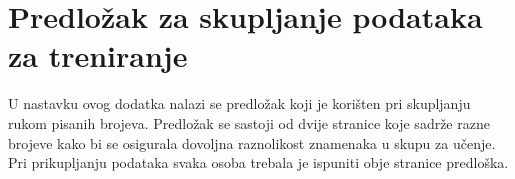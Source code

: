 \chapter{Predložak za skupljanje podataka za treniranje}
\label{ch:predlozak-za-skupljanje-podataka-za-treniranje}
U nastavku ovog dodatka nalazi se predložak koji je korišten pri skupljanju rukom pisanih brojeva. Predložak se sastoji
od dvije stranice koje sadrže razne brojeve kako bi se osigurala dovoljna raznolikost znamenaka u skupu za učenje. Pri
prikupljanju podataka svaka osoba trebala je ispuniti obje stranice predloška.


